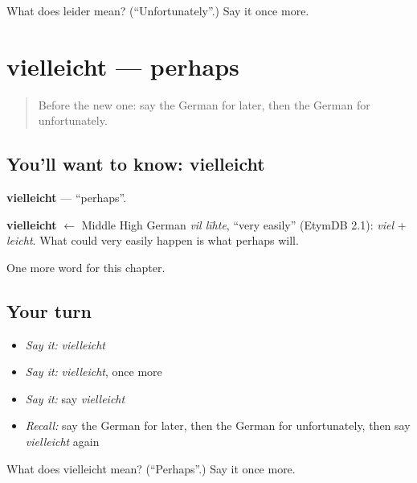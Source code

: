 \begin{tcolorbox}[breakable,colback=teal!4,colframe=teal!35!black,title={Before you move on}]
What does leider mean? (\textquotedblleft{}Unfortunately\textquotedblright{}.) Say it once more.
\end{tcolorbox}
\section[vielleicht]{vielleicht — perhaps}

\label{lesson:GE-C172-vielleicht}



\begin{quote}
Before the new one: say the German for later, then the German for unfortunately.
\end{quote}

\subsection*{You'll want to know: vielleicht}
\textbf{vielleicht} — \textquotedblleft{}perhaps\textquotedblright{}.

\begin{cousinweb}
\textbf{vielleicht} $\leftarrow$ Middle High German \emph{vil līhte}, \textquotedblleft{}very easily\textquotedblright{} (EtymDB 2.1): \emph{viel} + \emph{leicht}. What could very easily happen is what perhaps will.
\end{cousinweb}

\begin{grammarlens}[title={What you've built}]
One more word for this chapter.
\end{grammarlens}

\subsection*{Your turn}
\begin{itemize}
\raggedright
  \item \emph{Say it:} \emph{vielleicht}
  \item \emph{Say it:} \emph{vielleicht}, once more
  \item \emph{Say it:} say \emph{vielleicht}
  \item \emph{Recall:} say the German for later, then the German for unfortunately, then say \emph{vielleicht} again
\end{itemize}

\begin{tcolorbox}[breakable,colback=teal!4,colframe=teal!35!black,title={Before you move on}]
What does vielleicht mean? (\textquotedblleft{}Perhaps\textquotedblright{}.) Say it once more.
\end{tcolorbox}
